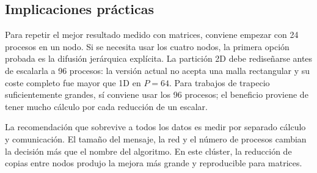 \subsection{Implicaciones prácticas}

Para repetir el mejor resultado medido con matrices, conviene empezar con 24 procesos en un nodo. Si se necesita usar los cuatro nodos, la primera opción probada es la difusión jerárquica explícita. La partición 2D debe rediseñarse antes de escalarla a 96 procesos: la versión actual no acepta una malla rectangular y su coste completo fue mayor que 1D en $P=64$. Para trabajos de trapecio suficientemente grandes, sí conviene usar los 96 procesos; el beneficio proviene de tener mucho cálculo por cada reducción de un escalar.

\begin{idea}
La recomendación que sobrevive a todos los datos es medir por separado cálculo y comunicación. El tamaño del mensaje, la red y el número de procesos cambian la decisión más que el nombre del algoritmo. En este clúster, la reducción de copias entre nodos produjo la mejora más grande y reproducible para matrices.
\end{idea}

